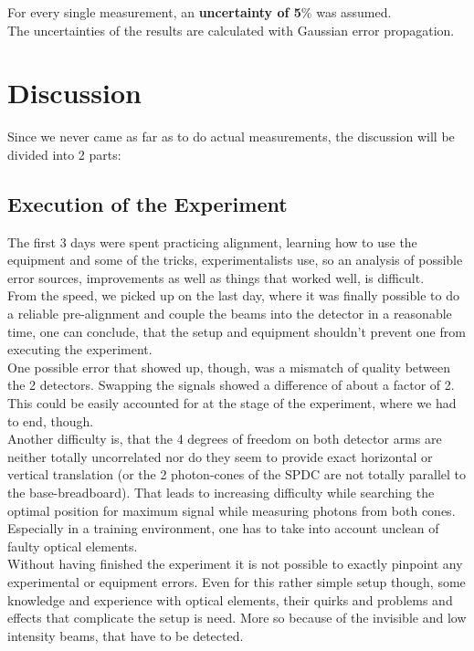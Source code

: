 \documentclass[12pt,a4paper]{article}
\begin{document}
\begin{multicols}{2}
\noindent For every single measurement, an \textbf{uncertainty of 5$\%$} was assumed.\\
The uncertainties of the results are calculated with Gaussian error propagation.




\section{Discussion}
Since we never came as far as to do actual measurements, the discussion will be divided into 2 parts:

\subsection{Execution of the Experiment}
The first 3 days were spent practicing alignment, learning how to use the equipment and some of the tricks, experimentalists use, so an analysis of possible error sources, improvements as well as things that worked well, is difficult.\\
From the speed, we picked up on the last day, where it was finally possible to do a reliable pre-alignment and couple the beams into the detector in a reasonable time, one can conclude, that the setup and equipment shouldn't prevent one from executing the experiment.\\
One possible error that showed up, though, was a mismatch of quality between the 2 detectors. Swapping the signals showed a difference of about a factor of 2. This could be easily accounted for at the stage of the experiment, where we had to end, though.\\
Another difficulty is, that the 4 degrees of freedom on both detector arms are neither totally uncorrelated nor do they seem to provide exact horizontal or vertical translation (or the 2 photon-cones of the SPDC are not totally parallel to the base-breadboard). That leads to increasing difficulty while searching the optimal position for maximum signal while measuring photons from both cones.\\
Especially in a training environment, one has to take into account unclean of faulty optical elements.\\
Without having finished the experiment it is not possible to exactly pinpoint any experimental or equipment errors. Even for this rather simple setup though, some knowledge and experience with optical elements, their quirks and problems and effects that complicate the setup is need. More so because of the invisible and low intensity beams, that have to be detected.\\


\end{multicols}
\end{document}
